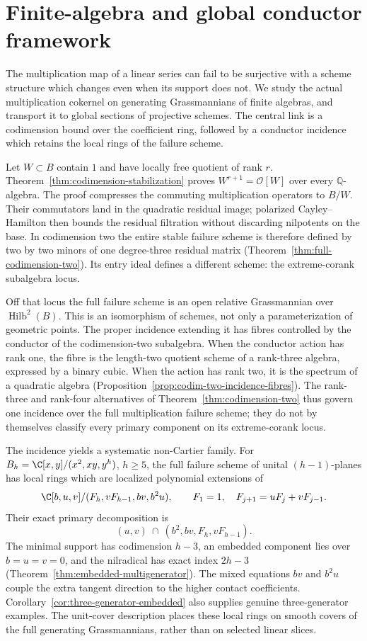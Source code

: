\section{Finite-algebra and global conductor framework}
\label{sec:conductor-introduction}
The multiplication map of a linear series can fail to be surjective
with a scheme structure which changes even when its support does not.
We study the actual multiplication cokernel on generating Grassmannians
of finite algebras, and transport it to global sections of projective
schemes. The central link is a codimension bound over the coefficient
ring, followed by a conductor incidence which retains the local rings
of the failure scheme.

Let $W\subset B$ contain $1$ and have locally free quotient of rank $r$.
Theorem~\ref{thm:codimension-stabilization} proves
$W^{r+1}=\mathcal O[W]$ over every $\mathbb Q$-algebra. The proof
compresses the commuting multiplication operators to $B/W$. Their
commutators land in the quadratic residual image; polarized
Cayley--Hamilton then bounds the residual filtration without discarding
nilpotents on the base. In codimension two the entire stable failure
scheme is therefore defined by two by two minors of one degree-three
residual matrix (Theorem~\ref{thm:full-codimension-two}). Its entry
ideal defines a different scheme: the extreme-corank subalgebra locus.

Off that locus the full failure scheme is an open relative
Grassmannian over $\operatorname{Hilb}^2(B)$. This is an isomorphism
of schemes, not only a parameterization of geometric points.
The proper incidence extending it has fibres controlled by the
conductor of the codimension-two subalgebra. When the conductor action
has rank one, the fibre is the length-two quotient scheme of a rank-three
algebra, expressed by a binary cubic. When the action has rank two,
it is the spectrum of a quadratic algebra
(Proposition~\ref{prop:codim-two-incidence-fibres}). The rank-three
and rank-four alternatives of Theorem~\ref{thm:codimension-two}
thus govern one incidence over the full multiplication failure scheme;
they do not by themselves classify every primary component on its
extreme-corank locus.

The incidence yields a systematic non-Cartier family. For
$B_h=\C[x,y]/(x^2,xy,y^h)$, $h\ge5$, the full failure scheme of
unital $(h-1)$-planes has local rings which are localized polynomial
extensions of
\[
 \C[b,u,v]/(F_h,vF_{h-1},bv,b^2u),
 \qquad F_1=1,\quad F_{j+1}=uF_j+vF_{j-1}.
\]
Their exact primary decomposition is
\[
 (u,v)\ \cap\ (b^2,bv,F_h,vF_{h-1}).
\]
The minimal support has codimension $h-3$, an embedded component
lies over $b=u=v=0$, and the nilradical has exact index $2h-3$
(Theorem~\ref{thm:embedded-multigenerator}). The mixed equations
$bv$ and $b^2u$ couple the extra tangent direction to the higher
contact coefficients. Corollary~\ref{cor:three-generator-embedded}
also supplies genuine three-generator examples. The unit-cover
description places these local rings on smooth covers of the full
generating Grassmannians, rather than on selected linear slices.

